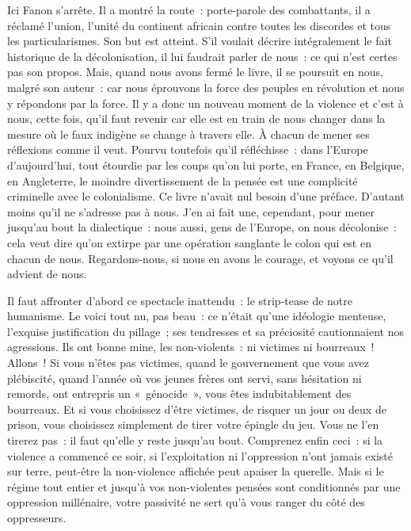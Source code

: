 \documentclass[french,twoside]{book} %
\begin{document}
\noindent Ici Fanon s’arrête. Il a montré la route : porte-parole des combattants, il a réclamé l’union, l’unité du continent africain contre toutes les discordes et tous les particularismes. Son but est atteint. S’il voulait décrire intégralement le fait historique de la décolonisation, il lui faudrait parler de nous : ce qui n’est certes pas son propos. Mais, quand nous avons fermé le livre, il se poursuit en nous, malgré son auteur : car nous éprouvons la force des peuples en révolution et nous y répondons par la force. Il y a donc un nouveau moment de la violence et c’est à nous, cette fois, qu’il faut revenir car elle est en train de nous changer dans la mesure où le faux indigène se change à travers elle. À chacun de mener ses réflexions comme il veut. Pourvu toutefois qu’il réfléchisse : dans l’Europe d’aujourd’hui, tout étourdie par les coups qu’on lui porte, en France, en Belgique, en Angleterre, le moindre divertissement de la pensée est une complicité criminelle avec le colonialisme. Ce livre n’avait nul besoin d’une préface. D’autant moins qu’il ne s’adresse pas à nous. J’en ai fait une, cependant, pour mener jusqu’au bout la dialectique : nous aussi, gens de l’Europe, on nous décolonise : cela veut dire qu’on extirpe par une opération sanglante le colon qui est en chacun de nous. Regardons-nous, si nous en avons le courage, et voyons ce qu’il advient de nous.\par
Il faut affronter d’abord ce spectacle inattendu : le strip-tease de notre humanisme. Le voici tout nu, pas beau : ce n’était qu’une idéologie menteuse, l’exquise justification du pillage ; ses tendresses et sa préciosité cautionnaient nos agressions. Ils ont bonne mine, les non-violents : ni victimes ni bourreaux ! Allons ! Si vous n’êtes pas victimes, quand le gouvernement que vous avez plébiscité, quand l’année où vos jeunes frères ont servi, sans hésitation ni remords, ont entrepris un « génocide », vous êtes indubitablement des bourreaux. Et si vous choisissez   d’être victimes, de risquer un jour ou deux de prison, vous choisissez simplement de tirer votre épingle du jeu. Vous ne l’en tirerez pas : il faut qu’elle y reste jusqu’au bout. Comprenez enfin ceci : si la violence a commencé ce soir, si l’exploitation ni l’oppression n’ont jamais existé sur terre, peut-être la non-violence affichée peut apaiser la querelle. Mais si le régime tout entier et jusqu’à vos non-violentes pensées sont conditionnés par une oppression millénaire, votre passivité ne sert qu’à vous ranger du côté des oppresseurs.\par
\end{document}
